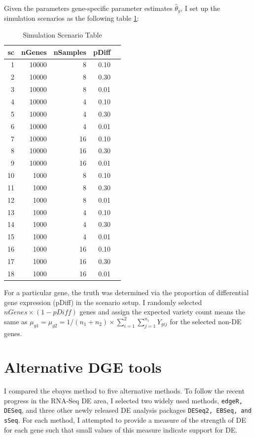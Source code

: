 \documentclass[11pt]{isuthesis}
\begin{document}
Given the parameters gene-specific parameter estimates $\hat{\theta}_g$, I set up the simulation scenarios as the following table \ref{tab:Scenario}:

\begin{table}[H]
\centering
\begin{tabular}{|r|r|r|r|r|}
\hline
sc & nGenes & nSamples & pDiff \\ 
\hline
1 & 10000 & 8 & 0.10 \\ 
\hline
2 & 10000 & 8 & 0.30 \\ 
\hline
3 & 10000 & 8 & 0.01 \\
\hline
4 & 10000 & 4 & 0.10 \\
\hline
5 & 10000 & 4 & 0.30 \\
\hline
6 & 10000 & 4 & 0.01 \\ 
\hline
7 & 10000 & 16 & 0.10 \\
\hline
8 & 10000 & 16 & 0.30 \\ 
\hline
9 & 10000 & 16 & 0.01 \\
\hline
10& 1000 & 8 & 0.10 \\
\hline
11 & 1000 & 8 & 0.30 \\
\hline
12 & 1000 & 8 & 0.01 \\ 
\hline
13 & 1000 & 4 & 0.10 \\
\hline
14 & 1000 & 4 & 0.30 \\
\hline
15 & 1000 & 4 & 0.01 \\ 
\hline
16 & 1000 & 16 & 0.10 \\
\hline
17 & 1000 & 16 & 0.30 \\ 
\hline
18 & 1000 & 16 & 0.01 \\ 
\hline
\end{tabular}
\caption{Simulation Scenario Table}
\label{tab:Scenario}
\end{table}

For a particular gene, the truth was determined via the proportion of differential gene expression (pDiff) in the scenario setup. I randomly selected $nGenes \times (1-pDiff)$ genes and assign the expected variety count means the same as $\mu_{g1} = \mu_{g2} = 1/(n_1+n_2)\times \sum_{i=1}^2 \sum_{j=1}^{n_i} Y_{gij}$ for the selected non-DE genes. 

\section{Alternative DGE tools}

I compared the ebayes method to five alternative methods. To follow the recent progress in the RNA-Seq DE area, I selected two widely used methods, {\tt edgeR, DESeq}, and three other newly released DE analysis packages {\tt DESeq2, EBSeq, and sSeq}. For each method, I attempted to provide a measure of the strength of DE for each gene such that small values of this measure indicate support for DE. 
\end{document}
